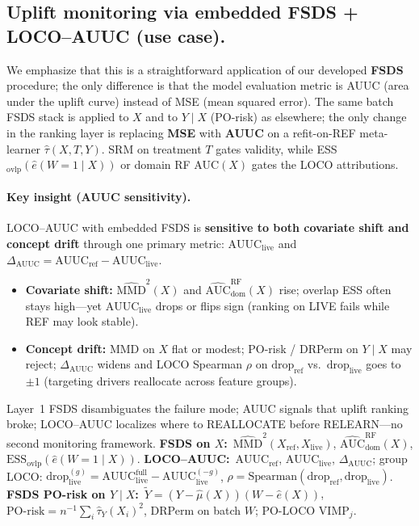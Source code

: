 \documentclass{article}
\begin{document}
\subsection{Uplift monitoring via embedded FSDS + LOCO--AUUC (use case).}
We emphasize that this is a straightforward application of our developed \textbf{FSDS} procedure; the only difference is that the model evaluation metric is AUUC (area under the uplift curve) instead of MSE (mean squared error). The same batch FSDS stack is applied to $X$ and to $Y\mid X$ (PO-risk) as elsewhere; the only change in the ranking layer is replacing \textbf{MSE} with \textbf{AUUC} on a refit-on-REF meta-learner $\hat\tau(X,T,Y)$.
SRM on treatment $T$ gates validity, while ESS$_{\mathrm{ovlp}}(\hat e(W{=}1\mid X))$ or domain RF AUC$(X)$ gates the LOCO attributions.
\paragraph{Key insight (AUUC sensitivity).}
LOCO--AUUC with embedded FSDS is \textbf{sensitive to both covariate shift and concept drift} through one primary metric: $\mathrm{AUUC}_{\mathrm{live}}$ and $\Delta_{\mathrm{AUUC}}=\mathrm{AUUC}_{\mathrm{ref}}-\mathrm{AUUC}_{\mathrm{live}}$.
\begin{itemize}\itemsep2pt
  \item \textbf{Covariate shift:} $\widehat{\mathrm{MMD}}^2(X)$ and $\widehat{\mathrm{AUC}}_{\mathrm{dom}}^{\mathrm{RF}}(X)$ rise; overlap ESS often stays high---yet $\mathrm{AUUC}_{\mathrm{live}}$ drops or flips sign (ranking on LIVE fails while REF may look stable).
  \item \textbf{Concept drift:} MMD on $X$ flat or modest; PO-risk / DRPerm on $Y\mid X$ may reject; $\Delta_{\mathrm{AUUC}}$ widens and LOCO Spearman $\rho$ on $\mathrm{drop}_{\mathrm{ref}}$ vs.\ $\mathrm{drop}_{\mathrm{live}}$ goes to $\pm 1$ (targeting drivers reallocate across feature groups).
\end{itemize}
Layer~1 FSDS disambiguates the failure mode; AUUC signals that uplift ranking broke; LOCO--AUUC localizes where to REALLOCATE before RELEARN---no second monitoring framework.
\noindent\textbf{FSDS on $X$:}\
$\widehat{\mathrm{MMD}}^2(X_{\mathrm{ref}},X_{\mathrm{live}})$,
$\widehat{\mathrm{AUC}}_{\mathrm{dom}}^{\mathrm{RF}}(X)$,
$\mathrm{ESS}_{\mathrm{ovlp}}(\hat e(W{=}1\mid X))$.
\noindent\textbf{LOCO--AUUC:}\
$\mathrm{AUUC}_{\mathrm{ref}}$, $\mathrm{AUUC}_{\mathrm{live}}$, $\Delta_{\mathrm{AUUC}}$;
group LOCO: $\mathrm{drop}_{\mathrm{live}}^{(g)}=\mathrm{AUUC}_{\mathrm{live}}^{\mathrm{full}}-\mathrm{AUUC}_{\mathrm{live}}^{(-g)}$,
$\rho=\mathrm{Spearman}(\mathrm{drop}_{\mathrm{ref}},\mathrm{drop}_{\mathrm{live}})$.
\noindent\textbf{FSDS PO-risk on $Y\mid X$:}\
$\tilde Y=(Y-\hat\mu(X))(W-\hat e(X))$,
$\mathrm{PO\text{-}risk}=n^{-1}\sum_i \hat\tau_Y(X_i)^2$,
DRPerm on batch $W$; PO-LOCO $\mathrm{VIMP}_j$.\\
\end{document}
